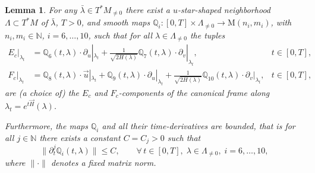 \documentclass[11pt,a4paper]{article}
\theoremstyle{plain}
\newtheorem{lemma}[theorem]{Lemma}
\theoremstyle{definition}
\theoremstyle{remark}
\numberwithin{equation}{section}
\newcommand{\N}{\mathbb{N}} %
\newcommand{\Q}{\mathbb{Q}}
\begin{document}
\begin{lemma}\label{l:lemmaEcFc}
For any $\bar{\lambda}\in T^*M_{\neq 0}$ there exist a $u$-star-shaped neighborhood $\Lambda \subset T^*M$ of $\bar{\lambda}$, $T>0$, and smooth maps $\Q_i: [0,T]\times  \Lambda_{\neq 0} \to \mathrm{M}(n_i,m_i)$, with $n_i,m_i\in \N$, $i=6,\dots,10$, such that for all $\lambda \in \Lambda_{\neq 0}$ the tuples
\begin{align}
E_c|_{\lambda_t} & = \Q_6(t,\lambda) \cdot \partial_u|_{\lambda_t}  + \frac{1}{\sqrt{2H(\lambda)}}\Q_7(t,\lambda)\cdot \partial_v|_{\lambda_t} , & t\in [0,T],\\
F_c|_{\lambda_t} & =  \Q_8(t,\lambda) \cdot \vec{u}|_{\lambda_t}  + \Q_9(t,\lambda) \cdot \partial_u|_{\lambda_t}  + \frac{1}{\sqrt{2H(\lambda)}}\Q_{10}(t,\lambda)\cdot \partial_v|_{\lambda_t} , & t\in [0,T],
\end{align}
are (a choice of) the $E_c$ and $F_c$-components of the canonical frame along $\lambda_t = e^{t\vec{H}}(\lambda)$.

Furthermore, the maps $\Q_i$ and all their time-derivatives are bounded, that is for all $j\in \N$ there exists a constant $C = C_j>0$ such that
\begin{equation}
\|\partial_t^{j}\Q_i(t,\lambda)\| \leq C ,\qquad \forall\, t \in [0,T],\; \lambda \in \Lambda_{\neq 0},\; i=6,\dots,10,
\end{equation}
where $\|\cdot\|$ denotes a fixed matrix norm.
\end{lemma}
\end{document}
